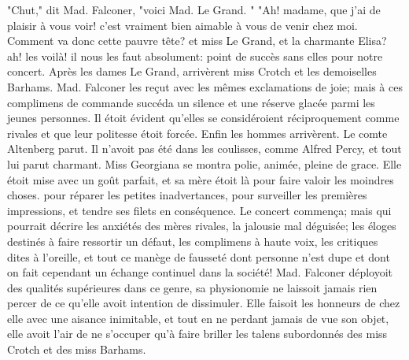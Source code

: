 "Chut," dit Mad. Falconer, "voici Mad. Le Grand. "
"Ah! madame, que j'ai de plaisir à vous voir! c'est vraiment bien aimable à vous de venir chez moi. Comment va donc cette pauvre tête? et miss Le Grand, et la charmante Elisa? ah! les voilà! il nous les faut absolument: point de succès sans elles pour notre concert.
Après les dames Le Grand, arrivèrent miss Crotch et les demoiselles Barhams. Mad. Falconer les reçut avec les mêmes exclamations de joie; mais à ces complimens de commande succéda un silence et une réserve glacée parmi les jeunes personnes. Il étoit évident qu'elles se considéroient réciproquement comme rivales et que leur politesse étoit forcée.
Enfin les hommes arrivèrent. Le comte Altenberg parut. Il n'avoit pas été dans les coulisses, comme Alfred Percy, et tout lui parut charmant. Miss Georgiana se montra polie, animée, pleine de grace. Elle étoit mise avec un goût parfait, et sa mère étoit là pour faire valoir les moindres choses. \setcounter{page}{116} pour réparer les petites inadvertances, pour surveiller les premières impressions, et tendre ses filets en conséquence.
Le concert commença; mais qui pourrait décrire les anxiétés des mères rivales, la jalousie mal déguisée; les éloges destinés à faire ressortir un défaut, les complimens à haute voix, les critiques dites à l'oreille, et tout ce manège de fausseté dont personne n'est dupe et dont on fait cependant un échange continuel dans la société!
Mad. Falconer déployoit des qualités supérieures dans ce genre, sa physionomie ne laissoit jamais rien percer de ce qu'elle avoit intention de dissimuler. Elle faisoit les honneurs de chez elle avec une aisance inimitable, et tout en ne perdant jamais de vue son objet, elle avoit l'air de ne s'occuper qu'à faire briller les talens subordonnés des miss Crotch et des miss Barhams.
